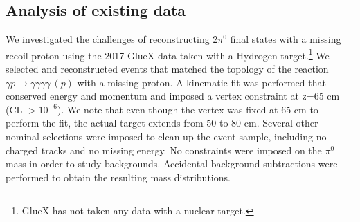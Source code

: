 
\subsection{Analysis of existing data}
We investigated the challenges of reconstructing 2$\pi^0$ final states
with a missing recoil proton using the 2017 GlueX data taken with a
Hydrogen target.\footnote{GlueX has not taken any data with a nuclear
  target.} We selected and reconstructed events that matched the
topology of the reaction $\gamma p\rightarrow \gamma \gamma \gamma
\gamma\, (p)$ with a missing proton. A kinematic fit was performed
that conserved energy and momentum and imposed a vertex constraint at
z=65 cm (CL $> 10^{-6}$). We note that even though the vertex was
fixed at 65 cm to perform the fit, the actual target extends from 50
to 80 cm. Several other nominal selections were imposed to clean up
the event sample, including no charged tracks and no missing
energy. No constraints were imposed on the $\pi^0$ mass in order to
study backgrounds. Accidental background subtractions were performed
to obtain the resulting mass distributions.
